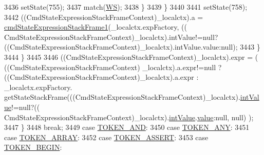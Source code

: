 \begin{DoxyCode}
3436             setState(755);
3437             match(\hyperlink{classgov_1_1nasa_1_1jpf_1_1inspector_1_1server_1_1expression_1_1parser_1_1_expression_grammar_parser_ace44714ae633c7b14794cc5a24d9ebf3}{WS});
3438             \}
3439           \}
3440 
3441           setState(758);
3442           ((CmdStateExpressionStackFrameContext)\_localctx).a = 
      \hyperlink{classgov_1_1nasa_1_1jpf_1_1inspector_1_1server_1_1expression_1_1parser_1_1_expression_grammar_parser_a7b51fc0f0baff269b98a4705322e2242}{cmdStateExpressionStackFrame1}(\_localctx.expFactory, ((
      CmdStateExpressionStackFrameContext)\_localctx).intValue!=null?((CmdStateExpressionStackFrameContext)\_localctx).intValue.value:null);
3443           \}
3444         \}
3445 
3446          ((CmdStateExpressionStackFrameContext)\_localctx).expr =  ( ((CmdStateExpressionStackFrameContext)
      \_localctx).a.expr!=null ? ((CmdStateExpressionStackFrameContext)\_localctx).a.expr :  \_localctx.expFactory.
      getStateStackFrame(((CmdStateExpressionStackFrameContext)\_localctx).\hyperlink{classgov_1_1nasa_1_1jpf_1_1inspector_1_1server_1_1expression_1_1parser_1_1_expression_grammar_parser_a8c7e4b657a12e07efe3ea6429cb9cdcf}{intValue}!=null?((
      CmdStateExpressionStackFrameContext)\_localctx).\hyperlink{classgov_1_1nasa_1_1jpf_1_1inspector_1_1server_1_1expression_1_1parser_1_1_expression_grammar_parser_a8c7e4b657a12e07efe3ea6429cb9cdcf}{intValue}.\hyperlink{classgov_1_1nasa_1_1jpf_1_1inspector_1_1server_1_1expression_1_1parser_1_1_expression_grammar_parser_1_1_int_value_context_a4c7175811f1802632486ad762d032ad5}{value}:null, null) ); 
3447         \}
3448         \textcolor{keywordflow}{break};
3449       \textcolor{keywordflow}{case} \hyperlink{classgov_1_1nasa_1_1jpf_1_1inspector_1_1server_1_1expression_1_1parser_1_1_expression_grammar_parser_a331667ae98e64b4bcdd3b866e7e2cd64}{TOKEN\_AND}:
3450       \textcolor{keywordflow}{case} \hyperlink{classgov_1_1nasa_1_1jpf_1_1inspector_1_1server_1_1expression_1_1parser_1_1_expression_grammar_parser_a21f8df7c638568302922694eab614972}{TOKEN\_ANY}:
3451       \textcolor{keywordflow}{case} \hyperlink{classgov_1_1nasa_1_1jpf_1_1inspector_1_1server_1_1expression_1_1parser_1_1_expression_grammar_parser_a5245a46acb46b8f00f1e7ef7d32101ea}{TOKEN\_ARRAY}:
3452       \textcolor{keywordflow}{case} \hyperlink{classgov_1_1nasa_1_1jpf_1_1inspector_1_1server_1_1expression_1_1parser_1_1_expression_grammar_parser_a5965ddc9ea8411ed43e28f73def173d2}{TOKEN\_ASSERT}:
3453       \textcolor{keywordflow}{case} \hyperlink{classgov_1_1nasa_1_1jpf_1_1inspector_1_1server_1_1expression_1_1parser_1_1_expression_grammar_parser_aeb1f6ac15295275b80fae4b59d753627}{TOKEN\_BEGIN}:

\end{DoxyCode}
